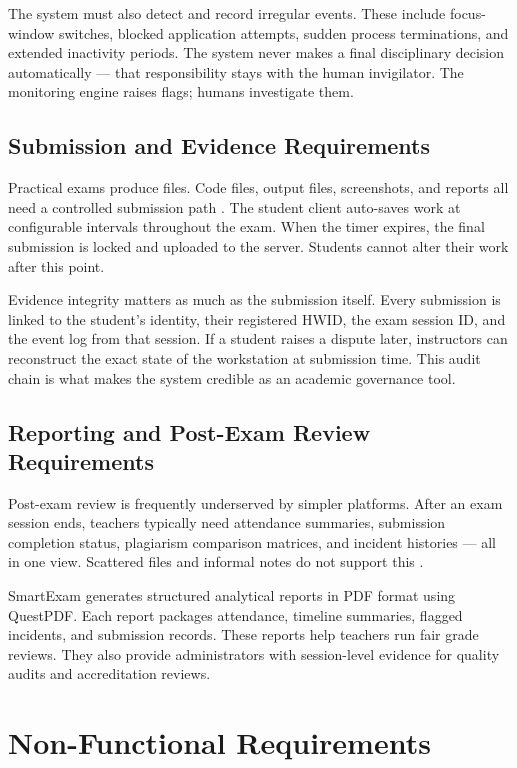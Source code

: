 The system must also detect and record irregular events. These include focus-window switches, blocked application attempts, sudden process terminations, and extended inactivity periods. The system never makes a final disciplinary decision automatically — that responsibility stays with the human invigilator. The monitoring engine raises flags; humans investigate them.

\subsection{Submission and Evidence Requirements}

Practical exams produce files. Code files, output files, screenshots, and reports all need a controlled submission path \cite{integ1}. The student client auto-saves work at configurable intervals throughout the exam. When the timer expires, the final submission is locked and uploaded to the server. Students cannot alter their work after this point.

Evidence integrity matters as much as the submission itself. Every submission is linked to the student's identity, their registered HWID, the exam session ID, and the event log from that session. If a student raises a dispute later, instructors can reconstruct the exact state of the workstation at submission time. This audit chain is what makes the system credible as an academic governance tool.

\subsection{Reporting and Post-Exam Review Requirements}

Post-exam review is frequently underserved by simpler platforms. After an exam session ends, teachers typically need attendance summaries, submission completion status, plagiarism comparison matrices, and incident histories — all in one view. Scattered files and informal notes do not support this \cite{elicit1}.

SmartExam generates structured analytical reports in PDF format using QuestPDF. Each report packages attendance, timeline summaries, flagged incidents, and submission records. These reports help teachers run fair grade reviews. They also provide administrators with session-level evidence for quality audits and accreditation reviews.

\section{Non-Functional Requirements}

